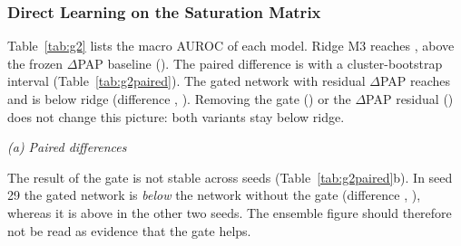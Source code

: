 \subsubsection{Direct Learning on the Saturation Matrix}
Table~\ref{tab:g2} lists the macro AUROC of each model. Ridge M3 reaches \nAucRidge{}, above the frozen
$\Delta$PAP baseline (\nAucDPAP{}). The paired difference is \nDRidgeDPAP{} with a cluster-bootstrap interval
\nCIRidgeDPAP{} (Table~\ref{tab:g2paired}). The gated network with residual $\Delta$PAP reaches \nAucGatePap{}
and is below ridge (difference \nDGateRidge{}, \nCIGateRidge{}). Removing the gate (\nAucNoGate{}) or the
$\Delta$PAP residual (\nAucGateNoPap{}) does not change this picture: both variants stay below ridge.

\begin{table}[htbp]
  \centering
  \caption[Macro AUROC on the \nNPep{} peptides of the saturation benchmark]{Macro AUROC on the \nNPep{} peptides of the saturation benchmark. The last column keeps only the cells
  whose exact sequence is not in the training data of the published Degformer.}\label{tab:g2}
  
\end{table}

\begin{table}[htbp]
  \centering
  \caption[Paired AUROC differences and per-seed AUROC]{Paired AUROC differences and per-seed AUROC. (a) Paired differences between models
  on the same peptides. (b) Per-seed AUROC of the three main models.}\label{tab:g2paired}
  {\small\textit{(a) Paired differences}}\par\smallskip
  
  \par{}\par\smallskip
  
\end{table}

The result of the gate is not stable across seeds (Table~\ref{tab:g2paired}b). In seed 29 the gated network is
\emph{below} the network without the gate (difference \nSeedFlipDelta{}, \nSeedFlipCI{}), whereas it is above in the other
two seeds. The ensemble figure should therefore not be read as evidence that the gate helps.

